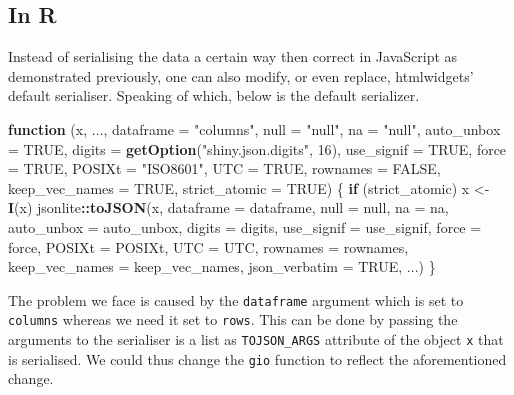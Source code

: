 \documentclass[
]{krantz}
\makeatletter
\newenvironment{Shaded}{\begin{snugshade}}{\end{snugshade}}
\newcommand{\ControlFlowTok}[1]{\textcolor[rgb]{0.27,0.27,0.27}{\textbf{#1}}}
\newcommand{\DataTypeTok}[1]{\textcolor[rgb]{0.27,0.27,0.27}{#1}}
\newcommand{\DecValTok}[1]{\textcolor[rgb]{0.06,0.06,0.06}{#1}}
\newcommand{\KeywordTok}[1]{\textcolor[rgb]{0.27,0.27,0.27}{\textbf{#1}}}
\newcommand{\NormalTok}[1]{#1}
\newcommand{\OperatorTok}[1]{\textcolor[rgb]{0.43,0.43,0.43}{\textbf{#1}}}
\newcommand{\OtherTok}[1]{\textcolor[rgb]{0.37,0.37,0.37}{#1}}
\newcommand{\StringTok}[1]{\textcolor[rgb]{0.5,0.5,0.5}{#1}}
\newenvironment{kframe}{%
\medskip{}
\setlength{\fboxsep}{.8em}
 \def\at@end@of@kframe{}%
 \ifinner\ifhmode%
  \def\at@end@of@kframe{\end{minipage}}%
  \begin{minipage}{\columnwidth}%
 \fi\fi%
 \def\FrameCommand##1{\hskip\@totalleftmargin \hskip-\fboxsep
 \colorbox{shadecolor}{##1}\hskip-\fboxsep
     \hskip-\linewidth \hskip-\@totalleftmargin \hskip\columnwidth}%
 \MakeFramed {\advance\hsize-\width
   \@totalleftmargin\z@ \linewidth\hsize
   \@setminipage}}%
 {\par\unskip\endMakeFramed%
 \at@end@of@kframe}
\renewenvironment{Shaded}{\begin{kframe}}{\end{kframe}}
\makeatother
\begin{document}
\hypertarget{in-r}{%
\subsection*{In R}\label{in-r}}


Instead of serialising the data a certain way then correct in JavaScript as demonstrated previously, one can also modify, or even replace, htmlwidgets' default serialiser. Speaking of which, below is the default serializer.

\begin{Shaded}
\begin{Highlighting}[]
\ControlFlowTok{function}\NormalTok{ (x, ..., }\DataTypeTok{dataframe =} \StringTok{"columns"}\NormalTok{, }\DataTypeTok{null =} \StringTok{"null"}\NormalTok{, }\DataTypeTok{na =} \StringTok{"null"}\NormalTok{, }
    \DataTypeTok{auto\_unbox =} \OtherTok{TRUE}\NormalTok{, }\DataTypeTok{digits =} \KeywordTok{getOption}\NormalTok{(}\StringTok{"shiny.json.digits"}\NormalTok{, }
        \DecValTok{16}\NormalTok{), }\DataTypeTok{use\_signif =} \OtherTok{TRUE}\NormalTok{, }\DataTypeTok{force =} \OtherTok{TRUE}\NormalTok{, }\DataTypeTok{POSIXt =} \StringTok{"ISO8601"}\NormalTok{, }
    \DataTypeTok{UTC =} \OtherTok{TRUE}\NormalTok{, }\DataTypeTok{rownames =} \OtherTok{FALSE}\NormalTok{, }\DataTypeTok{keep\_vec\_names =} \OtherTok{TRUE}\NormalTok{, }\DataTypeTok{strict\_atomic =} \OtherTok{TRUE}\NormalTok{) }
\NormalTok{\{}
    \ControlFlowTok{if}\NormalTok{ (strict\_atomic) }
\NormalTok{        x <{-}}\StringTok{ }\KeywordTok{I}\NormalTok{(x)}
\NormalTok{    jsonlite}\OperatorTok{::}\KeywordTok{toJSON}\NormalTok{(x, }\DataTypeTok{dataframe =}\NormalTok{ dataframe, }\DataTypeTok{null =}\NormalTok{ null, }\DataTypeTok{na =}\NormalTok{ na, }
        \DataTypeTok{auto\_unbox =}\NormalTok{ auto\_unbox, }\DataTypeTok{digits =}\NormalTok{ digits, }\DataTypeTok{use\_signif =}\NormalTok{ use\_signif, }
        \DataTypeTok{force =}\NormalTok{ force, }\DataTypeTok{POSIXt =}\NormalTok{ POSIXt, }\DataTypeTok{UTC =}\NormalTok{ UTC, }\DataTypeTok{rownames =}\NormalTok{ rownames, }
        \DataTypeTok{keep\_vec\_names =}\NormalTok{ keep\_vec\_names, }\DataTypeTok{json\_verbatim =} \OtherTok{TRUE}\NormalTok{, }
\NormalTok{        ...)}
\NormalTok{\}}
\end{Highlighting}
\end{Shaded}

The problem we face is caused by the \texttt{dataframe} argument which is set to \texttt{columns} whereas we need it set to \texttt{rows}. This can be done by passing the arguments to the serialiser is a list as \texttt{TOJSON\_ARGS} attribute of the object \texttt{x} that is serialised. We could thus change the \texttt{gio} function to reflect the aforementioned change.
\end{document}
